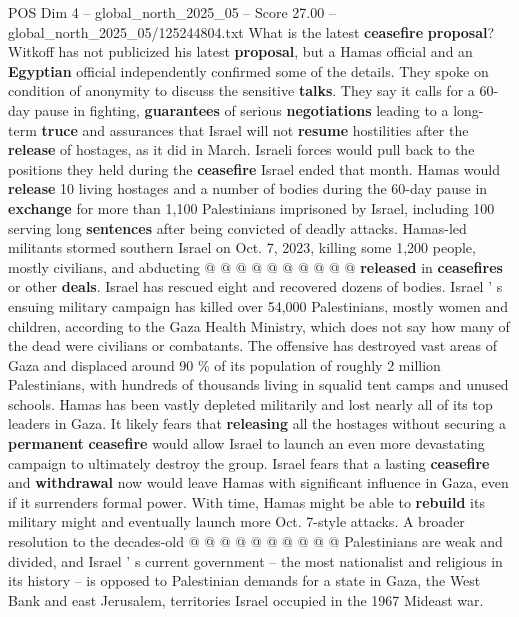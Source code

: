 \begin{textsample}{POS Dim 4 – global\_north\_2025\_05 – Score 27.00 – global\_north\_2025\_05/125244804.txt}
What is the latest \textbf{ceasefire} \textbf{proposal}?
Witkoff has not publicized his latest \textbf{proposal}, but a Hamas official and an \textbf{Egyptian} official independently confirmed some of the details.
They spoke on condition of anonymity to discuss the sensitive \textbf{talks}.
They say it calls for a 60-day pause in fighting, \textbf{guarantees} of serious \textbf{negotiations} leading to a long-term \textbf{truce} and assurances that Israel will not \textbf{resume} hostilities after the \textbf{release} of hostages, as it did in March.
Israeli forces would pull back to the positions they held during the \textbf{ceasefire} Israel ended that month.
Hamas would \textbf{release} 10 living hostages and a number of bodies during the 60-day pause in \textbf{exchange} for more than 1,100 Palestinians imprisoned by Israel, including 100 serving long \textbf{sentences} after being convicted of deadly attacks.
Hamas-led militants stormed southern Israel on Oct. 7, 2023, killing some 1,200 people, mostly civilians, and abducting @ @ @ @ @ @ @ @ @ @ \textbf{released} in \textbf{ceasefires} or other \textbf{deals}.
Israel has rescued eight and recovered dozens of bodies.
Israel ' s ensuing military campaign has killed over 54,000 Palestinians, mostly women and children, according to the Gaza Health Ministry, which does not say how many of the dead were civilians or combatants.
The offensive has destroyed vast areas of Gaza and displaced around 90 \% of its population of roughly 2 million Palestinians, with hundreds of thousands living in squalid tent camps and unused schools.
Hamas has been vastly depleted militarily and lost nearly all of its top leaders in Gaza.
It likely fears that \textbf{releasing} all the hostages without securing a \textbf{permanent} \textbf{ceasefire} would allow Israel to launch an even more devastating campaign to ultimately destroy the group.
Israel fears that a lasting \textbf{ceasefire} and \textbf{withdrawal} now would leave Hamas with significant influence in Gaza, even if it surrenders formal power.
With time, Hamas might be able to \textbf{rebuild} its military might and eventually launch more Oct. 7-style attacks.
A broader resolution to the decades-old @ @ @ @ @ @ @ @ @ @ Palestinians are weak and divided, and Israel ' s current government -- the most nationalist and religious in its history -- is opposed to Palestinian demands for a state in Gaza, the West Bank and east Jerusalem, territories Israel occupied in the 1967 Mideast war.

\end{textsample}
